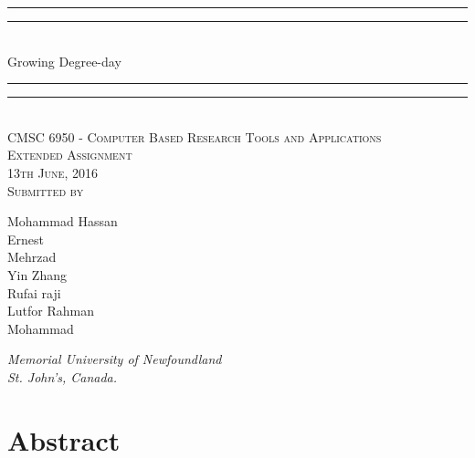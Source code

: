 \documentclass{article}
\begin{document}
{\centering

\rule{\textwidth}{1.6pt}\vspace*{-\baselineskip}\vspace*{2pt} 
\rule{\textwidth}{0.4pt}\\[\baselineskip] 
{\LARGE Growing Degree-day}
\rule{\textwidth}{0.4pt}\vspace*{-\baselineskip}\vspace{3.2pt}
\rule{\textwidth}{1.6pt}\\[\baselineskip] 

\vspace{20mm} %
\scshape %
CMSC 6950 - Computer Based Research Tools and Applications \\ [\baselineskip]
Extended Assignment \\[\baselineskip] 
13th June, 2016 \\[\baselineskip] 
\vspace{20mm} %
Submitted by \\[\baselineskip]
{\Large Mohammad Hassan \\ Ernest \\ Mehrzad \\ Yin Zhang \\ Rufai raji \\ Lutfor Rahman \\ Mohammad\par}
\vfill
{\itshape Memorial University of Newfoundland \\ St. John's, Canada.\par} 
}

\newpage

{\centering
  \section*{Abstract}
}
\end{document}

